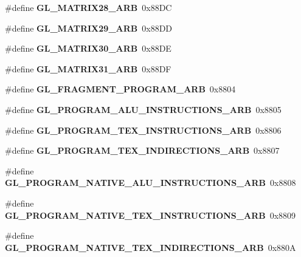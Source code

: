 \begin{DoxyCompactItemize}
\item 
\#define {\bfseries G\+L\+\_\+\+M\+A\+T\+R\+I\+X28\+\_\+\+A\+R\+B}~0x88\+D\+C\label{_s_d_l__opengl_8h_ad05c6269412c87966c4a5f93f96819a5}

\item 
\#define {\bfseries G\+L\+\_\+\+M\+A\+T\+R\+I\+X29\+\_\+\+A\+R\+B}~0x88\+D\+D\label{_s_d_l__opengl_8h_a5cb423b0cbe5e85e2152fff61410ed7c}

\item 
\#define {\bfseries G\+L\+\_\+\+M\+A\+T\+R\+I\+X30\+\_\+\+A\+R\+B}~0x88\+D\+E\label{_s_d_l__opengl_8h_a149b40e267b65dce7ee0384c4806974f}

\item 
\#define {\bfseries G\+L\+\_\+\+M\+A\+T\+R\+I\+X31\+\_\+\+A\+R\+B}~0x88\+D\+F\label{_s_d_l__opengl_8h_ab3ab477e830655dba6eeac67b633f15f}

\item 
\#define {\bfseries G\+L\+\_\+\+F\+R\+A\+G\+M\+E\+N\+T\+\_\+\+P\+R\+O\+G\+R\+A\+M\+\_\+\+A\+R\+B}~0x8804\label{_s_d_l__opengl_8h_a3752d06345bf9b7cd556c8c18f1af1df}

\item 
\#define {\bfseries G\+L\+\_\+\+P\+R\+O\+G\+R\+A\+M\+\_\+\+A\+L\+U\+\_\+\+I\+N\+S\+T\+R\+U\+C\+T\+I\+O\+N\+S\+\_\+\+A\+R\+B}~0x8805\label{_s_d_l__opengl_8h_a5eb810f874fa3cece06a685d2c5b18b6}

\item 
\#define {\bfseries G\+L\+\_\+\+P\+R\+O\+G\+R\+A\+M\+\_\+\+T\+E\+X\+\_\+\+I\+N\+S\+T\+R\+U\+C\+T\+I\+O\+N\+S\+\_\+\+A\+R\+B}~0x8806\label{_s_d_l__opengl_8h_abce582cf2d6e50b709dde2865a3ac313}

\item 
\#define {\bfseries G\+L\+\_\+\+P\+R\+O\+G\+R\+A\+M\+\_\+\+T\+E\+X\+\_\+\+I\+N\+D\+I\+R\+E\+C\+T\+I\+O\+N\+S\+\_\+\+A\+R\+B}~0x8807\label{_s_d_l__opengl_8h_a8e353235a029666f75d2c7ca8d842226}

\item 
\#define {\bfseries G\+L\+\_\+\+P\+R\+O\+G\+R\+A\+M\+\_\+\+N\+A\+T\+I\+V\+E\+\_\+\+A\+L\+U\+\_\+\+I\+N\+S\+T\+R\+U\+C\+T\+I\+O\+N\+S\+\_\+\+A\+R\+B}~0x8808\label{_s_d_l__opengl_8h_a667c1d35dd005779fb65980da6302d64}

\item 
\#define {\bfseries G\+L\+\_\+\+P\+R\+O\+G\+R\+A\+M\+\_\+\+N\+A\+T\+I\+V\+E\+\_\+\+T\+E\+X\+\_\+\+I\+N\+S\+T\+R\+U\+C\+T\+I\+O\+N\+S\+\_\+\+A\+R\+B}~0x8809\label{_s_d_l__opengl_8h_a256d1c0898a9e842a1bc472cf7963ab4}

\item 
\#define {\bfseries G\+L\+\_\+\+P\+R\+O\+G\+R\+A\+M\+\_\+\+N\+A\+T\+I\+V\+E\+\_\+\+T\+E\+X\+\_\+\+I\+N\+D\+I\+R\+E\+C\+T\+I\+O\+N\+S\+\_\+\+A\+R\+B}~0x880\+A\label{_s_d_l__opengl_8h_a2380e40c36bd8d42f1e3468eb9c4ef37}


\end{DoxyCompactItemize}
